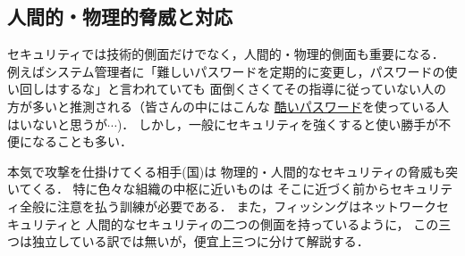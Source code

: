 \subsection{人間的・物理的脅威と対応}
セキュリティでは技術的側面だけでなく，人間的・物理的側面も重要になる．
例えばシステム管理者に「難しいパスワードを定期的に変更し，パスワードの使い回しはするな」と言われていても
面倒くさくてその指導に従っていない人の方が多いと推測される（皆さんの中にはこんな
\href{https://nordpass.com/most-common-passwords-list/}{酷いパスワード}を使っている人はいないと思うが$\cdots$)．
しかし，一般にセキュリティを強くすると使い勝手が不便になることも多い．


\emptyline



本気で攻撃を仕掛けてくる相手(国)は
物理的・人間的なセキュリティの脅威も突いてくる．
特に色々な組織の中枢に近いものは
そこに近づく前からセキュリティ全般に注意を払う訓練が必要である．
また，フィッシングはネットワークセキュリティと
人間的なセキュリティの二つの側面を持っているように，
この三つは独立している訳では無いが，便宜上三つに分けて解説する．
\emptyline

